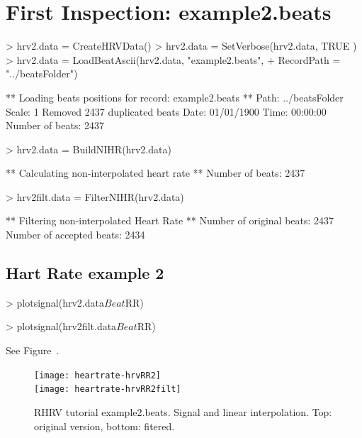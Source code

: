\documentclass[a4paper, english, utf8]{amsart}
\newcommand{\figref}[1]{Figure\ \Vref{#1}}
\begin{document}
\clearpage

\section{First Inspection: example2.beats}
\begin{Schunk}
\begin{Sinput}
> hrv2.data  = CreateHRVData()
> hrv2.data = SetVerbose(hrv2.data, TRUE )
> hrv2.data = LoadBeatAscii(hrv2.data, "example2.beats",
+        RecordPath = "../beatsFolder")
\end{Sinput}
\begin{Soutput}
** Loading beats positions for record: example2.beats **
   Path: ../beatsFolder 
   Scale: 1 
   Removed 2437 duplicated beats
   Date: 01/01/1900
   Time: 00:00:00
   Number of beats: 2437 
\end{Soutput}
\begin{Sinput}
> hrv2.data = BuildNIHR(hrv2.data)
\end{Sinput}
\begin{Soutput}
** Calculating non-interpolated heart rate **
   Number of beats: 2437 
\end{Soutput}
\begin{Sinput}
> hrv2filt.data = FilterNIHR(hrv2.data)
\end{Sinput}
\begin{Soutput}
** Filtering non-interpolated Heart Rate **
   Number of original beats: 2437 
   Number of accepted beats: 2434 
\end{Soutput}
\end{Schunk}

\subsection{Hart Rate example 2}
\begin{Schunk}
\begin{Sinput}
> plotsignal(hrv2.data$Beat$RR)
\end{Sinput}
\end{Schunk}
\begin{Schunk}
\begin{Sinput}
> plotsignal(hrv2filt.data$Beat$RR)
\end{Sinput}
\end{Schunk}
See \figref{fig:recurrence-hrvRR2}.


\begin{figure}[htbp]
\begin{center}
\texttt{[image: heartrate-hrvRR2]}\\
\texttt{[image: heartrate-hrvRR2filt]}
\caption{RHRV tutorial example2.beats. Signal and linear interpolation.
Top: original version, bottom: fitered.} 
\label{fig:recurrence-hrvRR2}
\end{center}
\end{figure}
\end{document}
